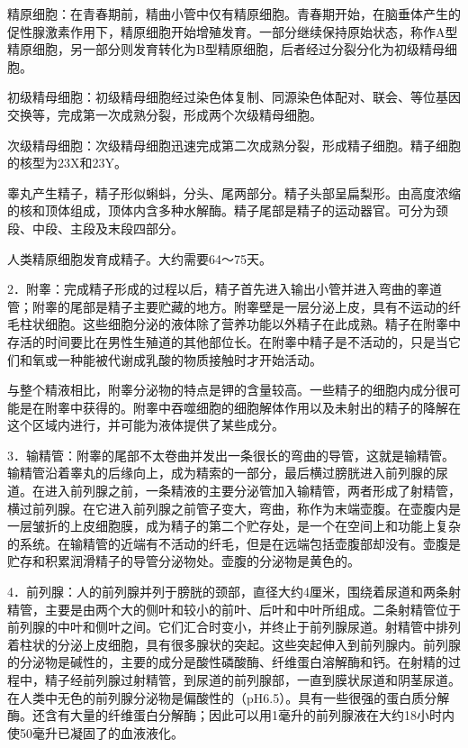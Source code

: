 \documentclass[12pt,UTF8]{ctexbook}
\begin{document}
精原细胞：在青春期前，精曲小管中仅有精原细胞。青春期开始，在脑垂体产生的促性腺激素作用下，精原细胞开始增殖发育。一部分继续保持原始状态，称作A型精原细胞，另一部分则发育转化为B型精原细胞，后者经过分裂分化为初级精母细胞。

初级精母细胞：初级精母细胞经过染色体复制、同源染色体配对、联会、等位基因交换等，完成第一次成熟分裂，形成两个次级精母细胞。

次级精母细胞：次级精母细胞迅速完成第二次成熟分裂，形成精子细胞。精子细胞的核型为23X和23Y。

睾丸产生精子，精子形似蝌蚪，分头、尾两部分。精子头部呈扁梨形。由高度浓缩的核和顶体组成，顶体内含多种水解酶。精子尾部是精子的运动器官。可分为颈段、中段、主段及末段四部分。

人类精原细胞发育成精子。大约需要64～75天。

2．附睾：完成精子形成的过程以后，精子首先进入输出小管并进入弯曲的睾道管；附睾的尾部是精子主要贮藏的地方。附睾壁是一层分泌上皮，具有不运动的纤毛柱状细胞。这些细胞分泌的液体除了营养功能以外精子在此成熟。精子在附睾中存活的时间要比在男性生殖道的其他部位长。在附睾中精子是不活动的，只是当它们和氧或一种能被代谢成乳酸的物质接触时才开始活动。

与整个精液相比，附睾分泌物的特点是钾的含量较高。一些精子的细胞内成分很可能是在附睾中获得的。附睾中吞噬细胞的细胞解体作用以及未射出的精子的降解在这个区域内进行，并可能为液体提供了某些成分。

3．输精管：附睾的尾部不太卷曲并发出一条很长的弯曲的导管，这就是输精管。输精管沿着睾丸的后缘向上，成为精索的一部分，最后横过膀胱进入前列腺的尿道。在进入前列腺之前，一条精液的主要分泌管加入输精管，两者形成了射精管，横过前列腺。在它进入前列腺之前管子变大，弯曲，称作为末端壶腹。在壶腹内是一层皱折的上皮细胞膜，成为精子的第二个贮存处，是一个在空间上和功能上复杂的系统。在输精管的近端有不活动的纤毛，但是在远端包括壶腹部却没有。壶腹是贮存和积累润滑精子的导管分泌物处。壶腹的分泌物是黄色的。

4．前列腺：人的前列腺并列于膀胱的颈部，直径大约4厘米，围绕着尿道和两条射精管，主要是由两个大的侧叶和较小的前叶、后叶和中叶所组成。二条射精管位于前列腺的中叶和侧叶之间。它们汇合时变小，并终止于前列腺尿道。射精管中排列着柱状的分泌上皮细胞，具有很多腺状的突起。这些突起伸入到前列腺内。前列腺的分泌物是碱性的，主要的成分是酸性磷酸酶、纤维蛋白溶解酶和钙。在射精的过程中，精子经前列腺过射精管，到尿道的前列腺部，一直到膜状尿道和阴茎尿道。在人类中无色的前列腺分泌物是偏酸性的（pH6.5）。具有一些很强的蛋白质分解酶。还含有大量的纤维蛋白分解酶；因此可以用1毫升的前列腺液在大约18小时内使50毫升已凝固了的血液液化。
\end{document}
